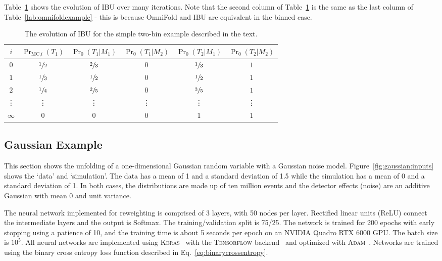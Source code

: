 Table~\ref{lab:ibuexample} shows the evolution of IBU over many iterations.  Note that the second column of Table~\ref{lab:ibuexample} is the same as the last column of Table~\ref{lab:omnifoldexample} - this is because OmniFold and IBU are equivalent in the binned case.

\begin{table}[h!]
\centering
\begin{tabular}{|cccccc| }
\hline
$i$ & $\Pr_\text{MC,$i$}(T_1)$ & $\Pr_0(T_1|M_1)$ & $\Pr_0(T_1|M_2)$ & $\Pr_0(T_2|M_1)$ & $\Pr_0(T_2|M_2)$\\
\hline
$0$ & $\sfrac{1}{2}$ & $\sfrac{2}{3}$ & 0 & $\sfrac{1}{3}$ & $1$\\
$1$ & $\sfrac{1}{3}$ & $\sfrac{1}{2}$ & 0 & $\sfrac{1}{2}$ & $1$\\
$2$ & $\sfrac{1}{4}$ & $\sfrac{2}{5}$ & 0 & $\sfrac{3}{5}$ & $1$\\
\vdots & \vdots & \vdots & \vdots & \vdots & \vdots  \\
$\infty$ & 0 & 0 & 0 & 1 & 1\\
\hline
\end{tabular}
\caption{The evolution of IBU for the simple two-bin example described in the text.}
\label{lab:ibuexample}
\end{table}

\subsection{Gaussian Example}

This section shows the unfolding of a one-dimensional Gaussian random variable with a Gaussian noise model.  Figure~\ref{fig:gaussian:inputs} shows the `data' and `simulation'.  The data has a mean of 1 and a standard deviation of 1.5 while the simulation has a mean of 0 and a standard deviation of 1.  In both cases, the distributions are made up of ten million events and the detector effects (noise) are an additive Gaussian with mean 0 and unit variance.

The neural network implemented for reweighting is comprised of 3 layers, with 50 nodes per layer.  Rectified linear units (ReLU) connect the intermediate layers and the output is Softmax.  The training/validation split is 75/25.  The network is trained for 200 epochs with early stopping using a patience of 10, and the training time is about 5 seconds per epoch on an NVIDIA Quadro RTX 6000 GPU. The batch size is $10^5$.  All neural networks are implemented using \textsc{Keras}~\cite{keras} with the \textsc{Tensorflow} backend~\cite{tensorflow} and optimized with \textsc{Adam}~\cite{adam}.  Networks are trained using the binary cross entropy loss function described in Eq.~\ref{eq:binarycrossentropy}.


